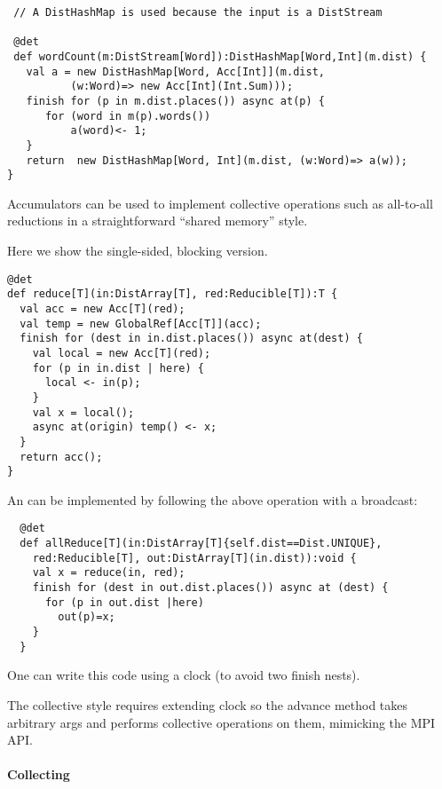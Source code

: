 \begin{example}
\begin{lstlisting}
 // A DistHashMap is used because the input is a DistStream

 @det 
 def wordCount(m:DistStream[Word]):DistHashMap[Word,Int](m.dist) {
   val a = new DistHashMap[Word, Acc[Int]](m.dist, 
          (w:Word)=> new Acc[Int](Int.Sum)));
   finish for (p in m.dist.places()) async at(p) {
      for (word in m(p).words())
          a(word)<- 1;
   }
   return  new DistHashMap[Word, Int](m.dist, (w:Word)=> a(w));
}
\end{lstlisting}
  
\end{example}


Accumulators can be used to implement collective operations such as
all-to-all reductions in a straightforward ``shared memory'' style.

Here we show the single-sided, blocking version.
\begin{example}
  \begin{lstlisting}
@det
def reduce[T](in:DistArray[T], red:Reducible[T]):T {
  val acc = new Acc[T](red);
  val temp = new GlobalRef[Acc[T]](acc);
  finish for (dest in in.dist.places()) async at(dest) {
    val local = new Acc[T](red);
    for (p in in.dist | here) {
      local <- in(p);
    }
    val x = local();
    async at(origin) temp() <- x;
  }
  return acc();
}    
\end{lstlisting}
\end{example}

An  can be implemented by following the above
operation with a broadcast:
\begin{lstlisting}
  @det
  def allReduce[T](in:DistArray[T]{self.dist==Dist.UNIQUE}, 
    red:Reducible[T], out:DistArray[T](in.dist)):void {
    val x = reduce(in, red);
    finish for (dest in out.dist.places()) async at (dest) {
      for (p in out.dist |here)
        out(p)=x;
    }      
  }
\end{lstlisting}
One can write this code using a clock (to avoid two finish nests).

The collective style requires extending clock so the advance method
takes arbitrary args and performs collective operations on them,
mimicking the MPI API.

\paragraph{Collecting }

